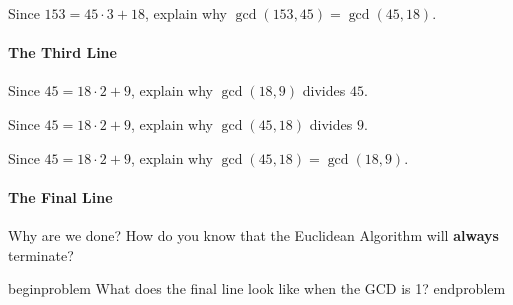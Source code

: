 \documentclass[nooutcomes]{ximera}
\begin{document}
\begin{problem}
Since $153 = 45\cdot 3 + 18$, explain why $\gcd(153,45) = \gcd(45,18)$.
\end{problem}


\paragraph{The Third Line}
\begin{problem}
Since $45 = 18\cdot 2 + 9$, explain why $\gcd(18,9)$ divides $45$.
\end{problem}

\begin{problem}
Since $45 = 18\cdot 2 + 9$, explain why $\gcd(45,18)$ divides $9$.
\end{problem}

\begin{problem}
Since $45 = 18\cdot 2 + 9$, explain why $\gcd(45,18) = \gcd(18,9)$.
\end{problem}


\paragraph{The Final Line}

\begin{problem}
Why are we done? How do you know that the Euclidean Algorithm
will \textbf{always} terminate?
\end{problem}

begin{problem}
What does the final line look like when the GCD is 1?
end{problem} 
\end{document}
